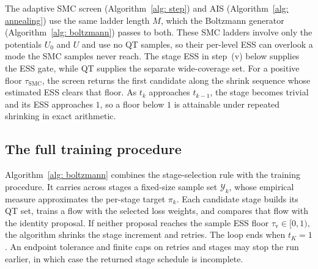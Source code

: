 \documentclass{article}
\begin{document}
The adaptive SMC screen (Algorithm~\ref{alg: step}) and AIS (Algorithm~\ref{alg: annealing}) use the same ladder length $M$, which the Boltzmann generator (Algorithm~\ref{alg: boltzmann}) passes to both. These SMC ladders involve only the potentials $U_0$ and $U$ and use no QT samples, so their per-level ESS can overlook a mode the SMC samples never reach. The stage ESS in step~(v) below supplies the ESS gate, while QT supplies the separate wide-coverage set. For a positive floor $\tau_{\mathrm{SMC}}$, the screen returns the first candidate along the shrink sequence whose estimated ESS clears that floor. As $t_k$ approaches $t_{k-1}$, the stage becomes trivial and its ESS approaches $1$, so a floor below $1$ is attainable under repeated shrinking in exact arithmetic.


\subsection{The full training procedure}

Algorithm~\ref{alg: boltzmann} combines the stage-selection rule with the training procedure. It carries across stages a fixed-size sample set $\mathcal Y_k$, whose empirical measure approximates the per-stage target $\pi_k$. Each candidate stage builds its QT set, trains a flow with the selected loss weights, and compares that flow with the identity proposal. If neither proposal reaches the sample ESS floor $\tau_{\mathrm v}\in[0,1)$, the algorithm shrinks the stage increment and retries. The loop ends when $t_K=1$. An endpoint tolerance and finite caps on retries and stages may stop the run earlier, in which case the returned stage schedule is incomplete.
\end{document}
